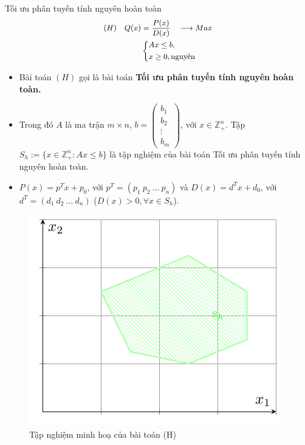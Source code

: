\documentclass[10pt]{beamer}
\begin{document}
\begin{frame}{Tối ưu phân tuyến tính nguyên hoàn toàn}
\begin{equation} \small
    \begin{split}
    (H) \quad Q(x) & = \frac{P(x)}{D(x)} \quad \longrightarrow Max \\
        & \left\{
        \begin{split}
        &Ax \leq  b, \\
        &x \geq 0, \text{nguyên} \\
        \end{split}
        \right.    
    \end{split}
\end{equation}            
\begin{itemize} \small
\item Bài toán $(H)$ gọi là bài toán \textbf{Tối ưu phân tuyến tính nguyên hoàn toàn.}
\item Trong đó $A$ là ma trận $m\times n$, $b=\begin{pmatrix}
    b_1 \\
    b_2 \\
    \vdots \\
    b_m
    \end{pmatrix}$, với $x\in \mathbb{Z}^n_+$. Tập $S_h:=\{x\in \mathbb{Z}^n_+: Ax\leq b\}$ là tập nghiệm của bài toán Tối ưu phân tuyến tính nguyên hoàn toàn. 
\item $P(x)=p^Tx+p_0$, với $p^T = (p_1 \: p_2 \: \ldots \: p_n)$ và $D(x)=d^Tx+d_0$, với $d^T = (d_1 \: d_2 \: \ldots \: d_n)$ ($D(x)>0, \forall x \in S_h$).
\end{itemize}
\end{frame}
\begin{frame}
    \begin{figure}[h]
        \centering
        \includegraphics[width=0.65\linewidth]{iflphoantoan.pdf}
        \caption{Tập nghiệm minh hoạ của bài toán (H)}
    \end{figure}
\end{frame}
\end{document}
